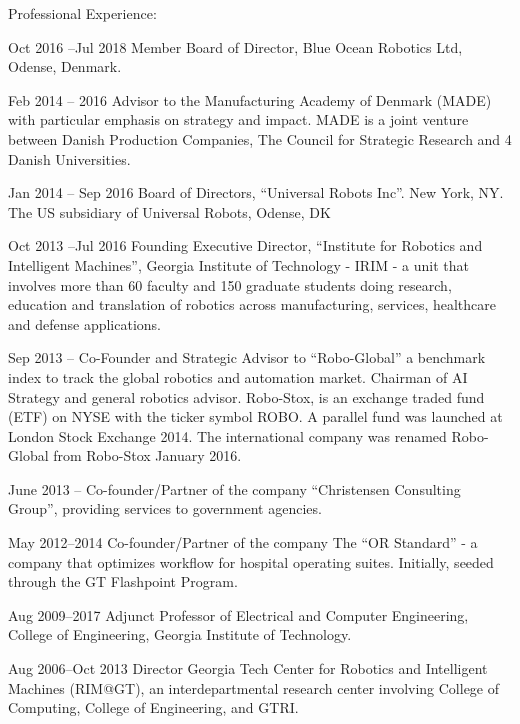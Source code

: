 \documentclass{article}
\begin{document}
\begin{cv}
\begin{cvlist}{Professional Experience:}
\item[Oct 2016 --Jul 2018] Member Board of Director, Blue Ocean Robotics Ltd,
  Odense, Denmark.

\item[Feb 2014 -- 2016] Advisor to the Manufacturing Academy of
  Denmark (MADE) with particular emphasis on strategy and impact. MADE
  is a joint venture between Danish Production Companies, The Council
  for Strategic Research and 4 Danish Universities.

\item[Jan 2014 -- Sep 2016] Board of Directors, ``Universal Robots
  Inc''. New York, NY. The US subsidiary of Universal Robots, Odense, DK

\item[Oct 2013 --Jul 2016] Founding Executive Director,
  ``Institute for Robotics and Intelligent
  Machines'', Georgia Institute of Technology - IRIM - a unit that
  involves more than 60 faculty and 150 graduate students doing
  research, education and translation of robotics across
  manufacturing, services, healthcare and defense applications.

\item[Sep 2013 --] Co-Founder and Strategic Advisor to ``Robo-Global''
  a benchmark index to track the global robotics and automation
  market. Chairman of AI Strategy and general robotics
  advisor. Robo-Stox, is an exchange traded fund (ETF) on NYSE with
  the ticker symbol ROBO.  A parallel fund was launched at London
  Stock Exchange 2014. The international company was renamed
  Robo-Global from Robo-Stox January 2016.

\item[June 2013 --] Co-founder/Partner of the company ``Christensen
  Consulting Group'', providing services to government agencies.

\item[May 2012--2014] Co-founder/Partner of the company The ``OR
  Standard'' - a company that optimizes workflow for hospital
  operating suites. Initially, seeded through the GT Flashpoint
  Program.

\item[Aug 2009--2017] Adjunct Professor of Electrical and Computer
  Engineering, College of Engineering, Georgia Institute of
  Technology.

\item[Aug 2006--Oct 2013] Director Georgia Tech Center for Robotics and
  Intelligent Machines (RIM@GT), an interdepartmental research center
  involving College of Computing, College of Engineering, and GTRI.


\end{cvlist}
\end{cv}
\end{document}
